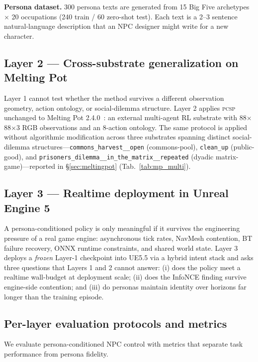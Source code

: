 \documentclass[conference]{IEEEtran}
\newcommand{\PCSP}{\textsc{pcsp}\xspace}
\begin{document}
\textbf{Persona dataset.}
300 persona texts are generated from 15 Big Five archetypes $\times$ 20
occupations (240 train / 60 zero-shot test).
Each text is a 2--3 sentence natural-language description that an NPC designer
might write for a new character.

\subsection{Layer 2 — Cross-substrate generalization on Melting Pot}
\label{sec:layer2env}

Layer 1 cannot test whether the method survives a different observation
geometry, action ontology, or social-dilemma structure. Layer 2 applies
\PCSP{} unchanged to Melting Pot 2.4.0~\cite{leibo2021meltingpot}: an
external multi-agent RL substrate with 88$\times$88$\times$3 RGB
observations and an 8-action ontology. The same protocol is applied
without algorithmic modification across three substrates spanning distinct
social-dilemma structures---\texttt{commons\_harvest\_\_open} (commons-pool),
\texttt{clean\_up} (public-good), and
\texttt{prisoners\_dilemma\_\_in\_the\_matrix\_\_repeated}
(dyadic matrix-game)---reported in \S\ref{sec:meltingpot} (Tab.~\ref{tab:mp_multi}).

\subsection{Layer 3 — Realtime deployment in Unreal Engine 5}
\label{sec:layer3env}

A persona-conditioned policy is only meaningful if it survives the
engineering pressure of a real game engine: asynchronous tick rates, NavMesh
contention, BT failure recovery, ONNX runtime constraints, and shared world
state. Layer 3 deploys a \emph{frozen} Layer-1 checkpoint into UE5.5 via a
hybrid intent stack and asks three questions that Layers 1 and 2 cannot
answer: (i) does the policy meet a realtime wall-budget at deployment scale;
(ii) does the InfoNCE finding survive engine-side contention; and (iii) do
personas maintain identity over horizons far longer than the training episode.

\subsection{Per-layer evaluation protocols and metrics}
\label{sec:evalprotocol}

We evaluate persona-conditioned NPC control with metrics that separate task
performance from persona fidelity.
\end{document}
